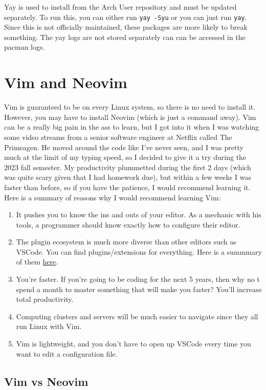 \documentclass{article}
\theoremstyle{definition}
\begin{document}
    Yay is used to install from the Arch User repository and must be updated separately. To run this, you can either run \texttt{yay -Syu} or you can just run \texttt{yay}. Since this is not officially maintained, these packages are more likely to break something. The yay logs are not stored separately can can be accessed in the pacman logs. 


\section{Vim and Neovim}

  Vim is guaranteed to be on every Linux system, so there is no need to install it. However, you may have to install Neovim (which is just a command away). Vim can be a really big pain in the ass to learn, but I got into it when I was watching some video streams from a senior software engineer at Netflix called The Primeagen. He moved around the code like I've never seen, and I was pretty much at the limit of my typing speed, so I decided to give it a try during the 2023 fall semester. My productivity plummetted during the first 2 days (which was quite scary given that I had homework due), but within a few weeks I was faster than before, so if you have the patience, I would recommend learning it. Here is a summary of reasons why I would recommend learning Vim: 
  \begin{enumerate}
    \item It pushes you to know the ins and outs of your editor. As a mechanic with his tools, a programmer should know exactly how to configure their editor.  
    \item The plugin ecosystem is much more diverse than other editors such as VSCode. You can find plugins/extensions for everything. Here is a summmary of them \href{https://github.com/rockerBOO/awesome-neovim\#neovim-lua-development}{here}. 
    \item You're faster. If you're going to be coding for the next 5 years, then why no t spend a month to master something that will make you faster? You'll increase total productivity. 
    \item Computing clusters and servers will be much easier to navigate since they all run Linux with Vim. 
    \item Vim is lightweight, and you don't have to open up VSCode every time you want to edit a configuration file.  
  \end{enumerate}

  \subsection{Vim vs Neovim}
\end{document}
